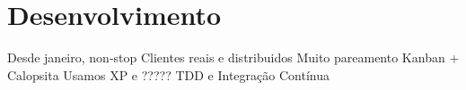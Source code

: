 \section{Desenvolvimento}

Desde janeiro, non-stop
Clientes reais e distribuidos
Muito pareamento
Kanban + Calopsita
Usamos XP e ?????
TDD e Integração Contínua

